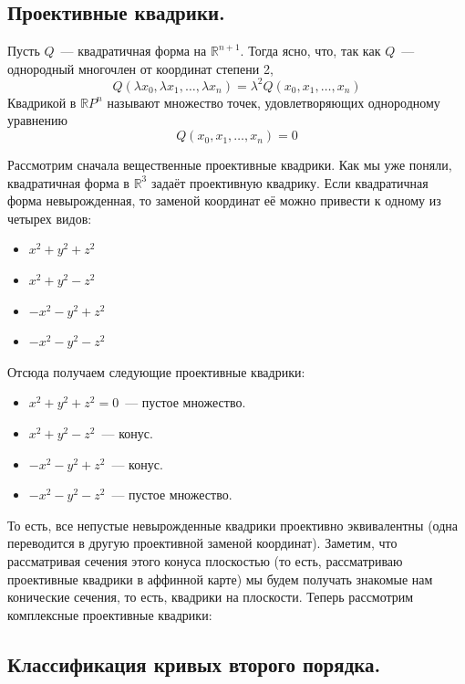 \documentclass[11pt]{report}
\begin{document}
    \subsection{Проективные квадрики.}
    \begin{definition}
        Пусть $Q$~--- квадратичная форма на $\mathbb{R}^{n + 1}$. Тогда ясно, что, так как $Q$~--- однородный многочлен от координат степени 2,
        \[ Q(\lambda x_0, \lambda x_1, \ldots, \lambda x_n) = \lambda^2 Q(x_0, x_1, \ldots, x_n) \]
        Квадрикой в $\mathbb{R}P^n$ называют множество точек, удовлетворяющих однородному уравнению
        \[Q(x_0, x_1, \ldots, x_n) = 0 \]
    \end{definition}
    Рассмотрим сначала вещественные проективные квадрики. Как мы уже поняли, квадратичная форма в  $\mathbb{R}^3$ задаёт
    проективную квадрику.
    Если квадратичная форма невырожденная, то заменой координат её можно привести к одному из четырех видов:
    \begin{itemize}
        \item $x^2 + y^2 + z^2$

        \item $x^2 + y^2 - z^2$

        \item $-x^2 - y^2 + z^2$

        \item $-x^2 - y^2 - z^2$
    \end{itemize}
    Отсюда получаем следующие проективные квадрики:
    \begin{itemize}
        \item $x^2 + y^2 + z^2 = 0$~--- пустое множество.

        \item $x^2 + y^2 - z^2$~--- конус.

        \item $-x^2 - y^2 + z^2$~--- конус.

        \item $-x^2 - y^2 - z^2$~--- пустое множество.
    \end{itemize}
    То есть, все непустые невырожденные квадрики проективно эквивалентны (одна переводится в другую проективной заменой координат).
    Заметим, что рассматривая сечения этого конуса плоскостью (то есть, рассматриваю проективные квадрики в аффинной карте) мы будем получать
    знакомые нам конические сечения, то есть, квадрики на плоскости.
    Теперь рассмотрим комплексные проективные квадрики:

    \subsection{Классификация кривых второго порядка.}
\end{document}
